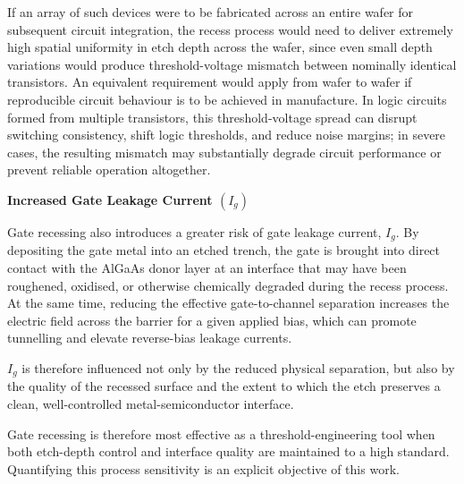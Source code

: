 \vspace{2mm}

If an array of such devices were to be fabricated across an entire wafer for
subsequent circuit integration, the recess process would need to deliver
extremely high spatial uniformity in etch depth across the wafer, since even
small depth variations would produce threshold-voltage mismatch between
nominally identical transistors. An equivalent requirement would apply from
wafer to wafer if reproducible circuit behaviour is to be achieved in
manufacture. In logic circuits formed from multiple transistors, this
threshold-voltage spread can disrupt switching consistency, shift logic
thresholds, and reduce noise margins; in severe cases, the resulting mismatch
may substantially degrade circuit performance or prevent reliable operation
altogether.

\vspace{4mm}

\noindent \textbf{Increased Gate Leakage Current $(I_{g})$}

\noindent Gate recessing also introduces a greater risk of gate leakage current,
$I_{g}$. By depositing the gate metal into an etched trench, the gate is
brought into direct contact with the AlGaAs donor layer at an interface that
may have been roughened, oxidised, or otherwise chemically degraded during the
recess process. At the same time, reducing the effective gate-to-channel
separation increases the electric field across the barrier for a given applied
bias, which can promote tunnelling and elevate reverse-bias leakage currents.

$I_{g}$ is therefore influenced not only by the reduced physical
separation, but also by the quality of the recessed surface and the extent to
which the etch preserves a clean, well-controlled metal-semiconductor
interface.

\vspace{8mm}

Gate recessing is therefore most effective as a threshold-engineering tool when
both etch-depth control and interface quality are maintained to a high
standard. Quantifying this process sensitivity is an explicit objective of this
work.
